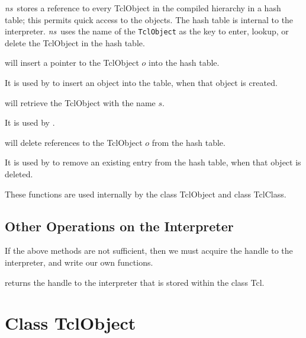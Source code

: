 \emph{ns}\ stores a reference to every TclObject in the compiled hierarchy
in a hash table;
this permits quick access to the objects.
The hash table is internal to the interpreter.
\emph{ns}\ uses the name of the {\tt TclObject} as the key
to enter, lookup, or delete the TclObject in the hash table.
\begin{list}{\textbullet}{}
\item {}
  will insert a pointer to the TclObject $o$ into the hash table.

  It is used by
  to insert an object into the table, when that object is created.

\item {}
  will retrieve the TclObject with the name $s$.

  It is used by
  .
\item {}
  will delete references to the TclObject $o$ from the hash table.

  It is used by
  to remove an existing entry from the hash table,
  when that object is deleted.
\end{list}
These functions are used internally by
the class TclObject and class TclClass.

\subsection{Other Operations on the Interpreter}
\label{sec:otcl:other}

If the above methods are not sufficient,
then we must acquire the handle to the interpreter,
and write our own functions.
\begin{list}{\textbullet}{}
\item {}
        returns the handle to the interpreter that is stored
        within the class Tcl.
\end{list}

\section{Class TclObject}
\label{sec:TclObject}

